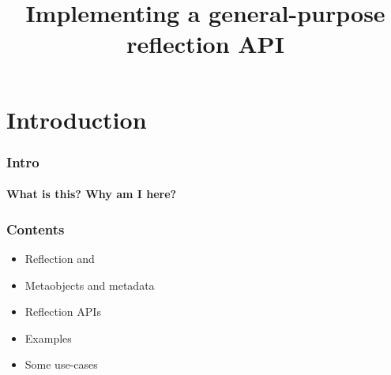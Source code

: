 \documentclass[compress,table,xcolor=table]{beamer}
\begin{document}
\title{Implementing a general-purpose reflection API}
\section{Introduction}
\begin{frame}
  \frametitle{Intro}
  \framesubtitle{What is this? Why am I here?}
\end{frame}
\begin{frame}
  \frametitle{Contents}
  \LARGE
  \begin{itemize}
    \item Reflection \smaller and 
    \item Metaobjects and metadata
    \item Reflection APIs
    \item Examples
    \item Some use-cases
  \end{itemize}
\end{frame}
\end{document}
